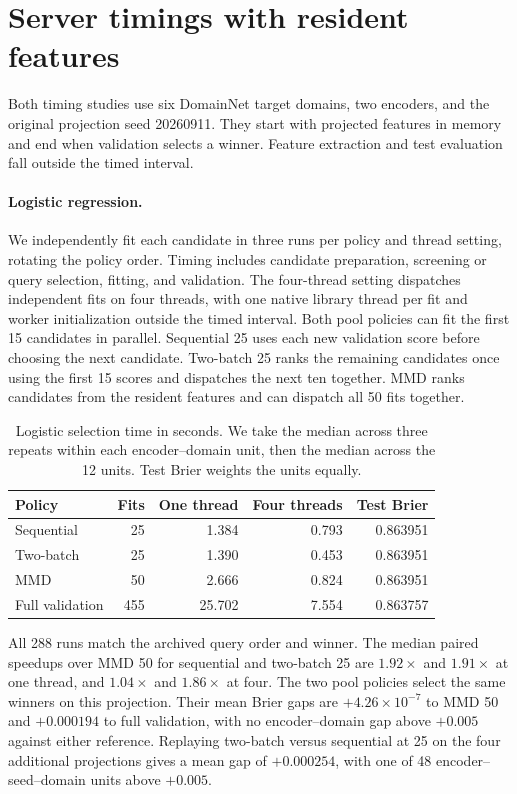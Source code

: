 \documentclass{article}
\begin{document}
\section{Server timings with resident features}
\label{app:server-timing}
Both timing studies use six DomainNet target domains, two encoders, and the original projection seed 20260911. They start with projected features in memory and end when validation selects a winner. Feature extraction and test evaluation fall outside the timed interval.

\paragraph{Logistic regression.}
We independently fit each candidate in three runs per policy and thread setting, rotating the policy order. Timing includes candidate preparation, screening or query selection, fitting, and validation. The four-thread setting dispatches independent fits on four threads, with one native library thread per fit and worker initialization outside the timed interval. Both pool policies can fit the first 15 candidates in parallel. Sequential 25 uses each new validation score before choosing the next candidate. Two-batch 25 ranks the remaining candidates once using the first 15 scores and dispatches the next ten together. MMD ranks candidates from the resident features and can dispatch all 50 fits together.

\begin{table}[ht]
\centering
\caption{Logistic selection time in seconds. We take the median across three repeats within each encoder--domain unit, then the median across the 12 units. Test Brier weights the units equally.}
\label{tab:pool-server-timing}
\begin{tabular}{lrrrr}
\toprule
Policy & Fits & One thread & Four threads & Test Brier \\
\midrule
Sequential & 25 & 1.384 & 0.793 & 0.863951 \\
Two-batch & 25 & 1.390 & 0.453 & 0.863951 \\
MMD & 50 & 2.666 & 0.824 & 0.863951 \\
Full validation & 455 & 25.702 & 7.554 & 0.863757 \\
\bottomrule
\end{tabular}
\end{table}

All 288 runs match the archived query order and winner. The median paired speedups over MMD 50 for sequential and two-batch 25 are $1.92\times$ and $1.91\times$ at one thread, and $1.04\times$ and $1.86\times$ at four. The two pool policies select the same winners on this projection. Their mean Brier gaps are $+4.26\times10^{-7}$ to MMD 50 and $+0.000194$ to full validation, with no encoder--domain gap above $+0.005$ against either reference. Replaying two-batch versus sequential at 25 on the four additional projections gives a mean gap of $+0.000254$, with one of 48 encoder--seed--domain units above $+0.005$.
\end{document}
